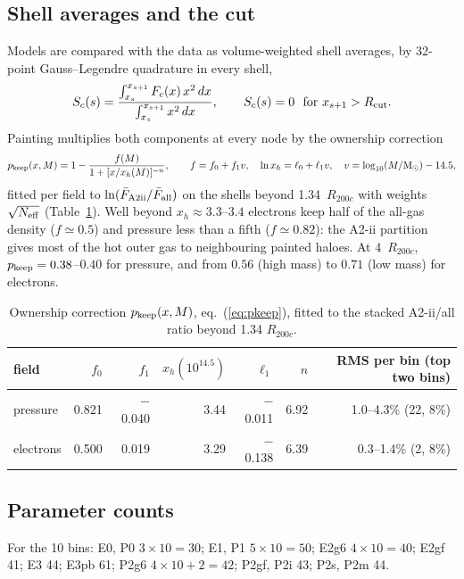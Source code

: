 \documentclass[10pt,a4paper]{article}
\newcommand{\Rc}{R_{200c}}
\newcommand{\Rcut}{R_{\rm cut}}
\newcommand{\pk}{p_{\rm keep}}
\begin{document}
\subsection{Shell averages and the cut}
Models are compared with the data as volume-weighted shell averages, by 32-point Gauss--Legendre quadrature in every
shell,
\begin{equation}
S_c(s)=\frac{\int_{x_s}^{x_{s+1}}F_c(x)\,x^2\,dx}{\int_{x_s}^{x_{s+1}}x^2\,dx},\qquad S_c(s)=0\ \text{ for } x_{s+1}>\Rcut .
\end{equation}
Painting multiplies both components at every node by the ownership correction
\begin{equation}
\pk(x,M)=1-\frac{f(M)}{1+[x/x_h(M)]^{-n}},\qquad f=f_0+f_1 v,\quad \ln x_h=\ell_0+\ell_1 v,\quad v=\log_{10}(M/{\rm M}_\odot)-14.5,
\label{eq:pkeep}
\end{equation}
fitted per field to $\ln(\bar F_{\rm A2ii}/\bar F_{\rm all})$ on the shells beyond 1.34~$\Rc$ with weights $\sqrt{N_{\rm eff}}$
(Table~\ref{tab:pkeep}). Well beyond $x_h\approx3.3$--$3.4$ electrons keep half of the all-gas density ($f\simeq0.5$) and
pressure less than a fifth ($f\simeq0.82$): the A2-ii partition gives most of the hot outer gas to neighbouring painted
haloes. At 4~$\Rc$, $\pk=0.38$--$0.40$ for pressure, and from $0.56$ (high mass) to $0.71$ (low mass) for electrons.

\begin{table}[H]
\centering
\footnotesize
\caption{Ownership correction $p_{\rm keep}(x,M)$, eq.~(\ref{eq:pkeep}), fitted to the stacked A2-ii/all ratio beyond 1.34 $R_{200c}$.}
\label{tab:pkeep}
\begin{tabular}{lrrrrrr}
\toprule
field & $f_0$ & $f_1$ & $x_h(10^{14.5})$ & $\ell_1$ & $n$ & RMS per bin (top two bins) \\
\midrule
pressure & 0.821 & $-$0.040 & 3.44 & $-$0.011 & 6.92 & 1.0--4.3\% (22, 8\%) \\
electrons & 0.500 & 0.019 & 3.29 & $-$0.138 & 6.39 & 0.3--1.4\% (2, 8\%) \\
\bottomrule
\end{tabular}
\end{table}

\subsection{Parameter counts}
For the 10 bins: E0, P0 $3\times10=30$; E1, P1 $5\times10=50$; E2g6 $4\times10=40$; E2gf 41; E3 44; E3pb 61; P2g6
$4\times10+2=42$; P2gf, P2i 43; P2s, P2m 44.
\end{document}
